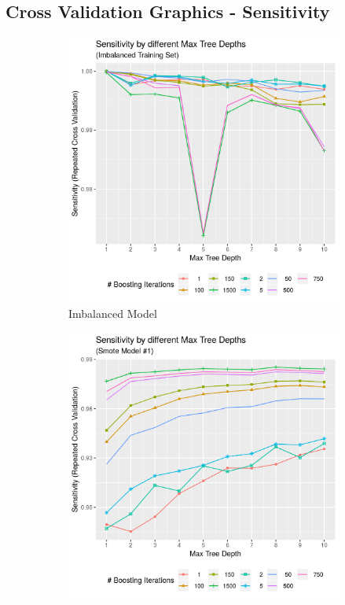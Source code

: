 \documentclass[12pt,a4paper]{article}
\begin{document}
\begin{appendices}
\section{Cross Validation Graphics - Sensitivity}\label{app:cv_graphics_sens}
\begin{figure}[h!] %
\begin{subfigure}{0.48\textwidth}
\includegraphics[width=\linewidth]{./graphics/cv/Sens_by_treeDepth_complete.png}
\caption{Imbalanced Model} \label{fig:a}
\end{subfigure}\hspace*{\fill}
\begin{subfigure}{0.48\textwidth}
\includegraphics[width=\linewidth]{./graphics/cv/Sens_by_treeDepth_smote1.png}

\end{subfigure}
\end{figure}
\end{appendices}
\end{document}
